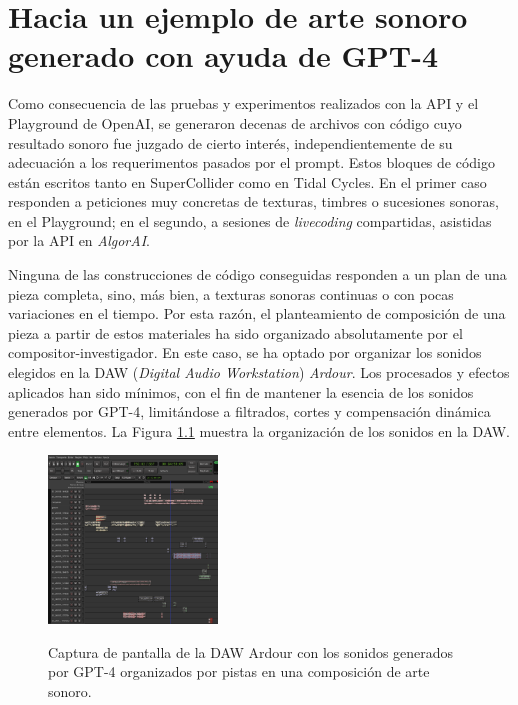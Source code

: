 \chapter{Hacia un ejemplo de arte sonoro generado con ayuda de GPT-4}

Como consecuencia de las pruebas y experimentos realizados con la API y el Playground de OpenAI, se generaron decenas de archivos con código cuyo resultado sonoro fue juzgado de cierto interés, independientemente de su adecuación a los requerimentos pasados por el prompt. Estos bloques de código están escritos tanto en SuperCollider como en Tidal Cycles. En el primer caso responden a peticiones muy concretas de texturas, timbres o sucesiones sonoras, en el Playground; en el segundo, a sesiones de \textit{livecoding} compartidas, asistidas por la API en \textit{AlgorAI}.

Ninguna de las construcciones de código conseguidas responden a un plan de una pieza completa, sino, más bien, a texturas sonoras continuas o con pocas variaciones en el tiempo. Por esta razón, el planteamiento de composición de una pieza a partir de estos materiales ha sido organizado absolutamente por el compositor-investigador. En este caso, se ha optado por organizar los sonidos elegidos en la DAW (\textit{Digital Audio Workstation}) \textit{Ardour}. Los procesados y efectos aplicados han sido mínimos, con el fin de mantener la esencia de los sonidos generados por GPT-4, limitándose a filtrados, cortes y compensación dinámica entre elementos. La Figura \ref{fig:ardour} muestra la organización de los sonidos en la DAW.

\begin{figure}[H]
    \caption[Captura de pantalla de la DAW Ardour con los sonidos generados por GPT-4 organizados en pistas]{Captura de pantalla de la DAW Ardour con los sonidos generados por GPT-4 organizados por pistas en una composición de arte sonoro.}
    \centering
    \includegraphics[width=0.4\textwidth]{./figuras/ardour.png}
    \label{fig:ardour}
\end{figure}

